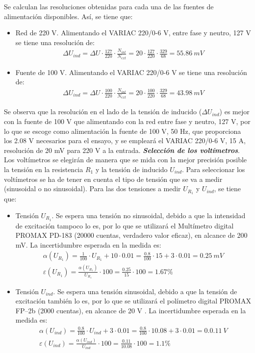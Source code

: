 \documentclass[a4paper,titlepage]{article}
\begin{document}
Se calculan las resoluciones obtenidas para cada una de las fuentes de alimentación disponibles. Así, se tiene que:
\begin{itemize}
    \item Red de 220 V. Alimentando el VARIAC 220/0-6 V, entre fase y neutro, 127 V se tiene una resolución de:
    \begin{gather*}
        \Delta U_{ind} = \Delta U\cdot \frac{127}{220}\cdot\frac{N_{int}}{N_{ext}} = 20\cdot\frac{127}{220}\cdot\frac{329}{68}= 55.86\:mV 
    \end{gather*}
    \item Fuente de 100 V. Alimentando el VARIAC 220/0-6 V se tiene una resolución de:
    \begin{gather*}
        \Delta U_{ind} = \Delta U\cdot \frac{100}{220}\cdot\frac{N_{int}}{N_{ext}} = 20\cdot\frac{100}{220}\cdot\frac{329}{68}= 43.98\:mV 
    \end{gather*}
\end{itemize}
Se observa que la resolución en el lado de la tensión de inducido ($\Delta U_{ind}$) es mejor con la fuente de 100 V que alimentando con la red entre fase y neutro, 127 V, por lo que se escoge como alimentación la fuente de 100 V, 50 Hz, que proporciona los 2.08 V necesarios para el ensayo, y se empleará el VARIAC 220/0-6 V, 15 A, resolución de 20 mV para 220 V a la entrada.
\newpage
\textbf{\textit{Selección de los voltímetros}}. Los voltímetros se elegirán de manera que se mida con la mejor precisión posible la tensión en la resistencia $R_1$ y la tensión de inducido $U_{ind}$. Para seleccionar los voltímetros se ha de tener en cuenta el tipo de tensión que se va a medir (sinusoidal o no sinusoidal). Para las dos tensiones a medir $U_{R_1}$ y $U_{ind}$, se tiene que:
\begin{itemize}
    \item Tensión $U_{R_1}$. Se espera una tensión no sinusoidal, debido a  que la intensidad de excitación tampoco lo es, por lo que se utilizará el Multímetro digital PROMAX PD-183 (20000 cuentas, verdadero valor eficaz), en alcance de 200 mV. La incertidumbre esperada en la medida es:
    \begin{gather*}
        \alpha(U_{R_1})=\frac{1}{100}\cdot U_{R_1}+10\cdot0.01=\frac{0.8}{100}\cdot 15+3\cdot0.01=0.25\:mV\\
        \varepsilon(U_{R_1})=\frac{\alpha(U_{R_1})}{U_{R_1}}\cdot100=\frac{0.25}{15}\cdot100=1.67\%
    \end{gather*}
    \item Tensión $U_{ind}$. Se espera una tensión sinusoidal, debido a  que la tensión de excitación también lo es, por lo que se utilizará el polímetro digital PROMAX FP–2b (2000 cuentas), en alcance de 20 V . La incertidumbre esperada en la medida es:
    \begin{gather*}
        \alpha(U_{ind})=\frac{0.8}{100}\cdot U_{ind}+3\cdot0.01=\frac{0.8}{100}\cdot 10.08+3\cdot0.01=0.0.11\:V\\
        \varepsilon(U_{ind})=\frac{\alpha(U_{ind})}{U_{ind}}\cdot100=\frac{0.11}{10.08}\cdot100=1.1\%
    \end{gather*}
\end{itemize}
\end{document}
